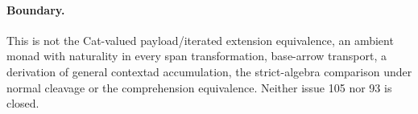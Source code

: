 \documentclass{article}
\begin{document}
\paragraph{Boundary.} This is not the Cat-valued payload/iterated extension equivalence, an ambient monad with naturality in every span transformation, base-arrow transport, a derivation of general contextad accumulation, the strict-algebra comparison under normal cleavage or the comprehension equivalence. Neither issue 105 nor 93 is closed.
\end{document}
